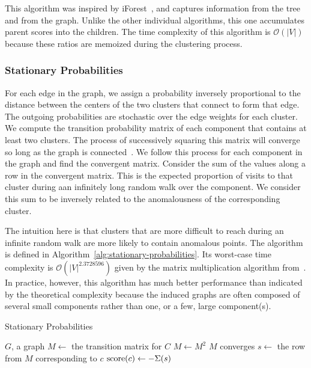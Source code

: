 This algorithm was inspired by iForest~\cite{tony2008iforest}, and captures information from the tree and from the graph.
Unlike the other individual algorithms, this one accumulates parent scores into the children.
The time complexity of this algorithm is $\mathcal{O}(|V|)$ because these ratios are memoized during the clustering process.


\subsubsection{Stationary Probabilities}
\label{subsubsec:methods:individual-algorithms:stationary-probabilities}
For each edge in the graph, we assign a probability inversely proportional to the distance between the centers of the two clusters that connect to form that edge.
The outgoing probabilities are stochastic over the edge weights for each cluster.
We compute the transition probability matrix of each component that contains at least two clusters.
The process of successively squaring this matrix will converge so long as the graph is connected~\cite{levin2017markov}.
We follow this process for each component in the graph and find the convergent matrix.
Consider the sum of the values along a row in the convergent matrix.
This is the expected proportion of visits to that cluster during aan infinitely long random walk over the component.
We consider this sum to be inversely related to the anomalousness of the corresponding cluster.

The intuition here is that clusters that are more difficult to reach during an infinite random walk are more likely to contain anomalous points.
The algorithm is defined in Algorithm~\ref{alg:stationary-probabilities}.
Its worst-case time complexity is $\mathcal{O}(|V|^{2.3728596})$ given by the matrix multiplication algorithm from~\cite{alman2021refined}.
In practice, however, this algorithm has much better performance than indicated by the theoretical complexity because the induced graphs are often composed of several small components rather than one, or a few, large component(s).

\begin{algorithm}[h]
    \caption{Stationary Probabilities}
    \label{alg:stationary-probabilities}
\begin{algorithmic}[1]
    \REQUIRE $G$, a graph
        \STATE $M \gets$ the transition matrix for $C$
        \REPEAT
            \STATE $M \gets M^2$
        \UNTIL $M$ converges
            \STATE $s \gets $ the row from $M$ corresponding to $c$
            \STATE $\operatorname{score}(c) \gets -\Sigma(s)$ 
        \ENDFOR
    \ENDFOR
\end{algorithmic}
\end{algorithm}


